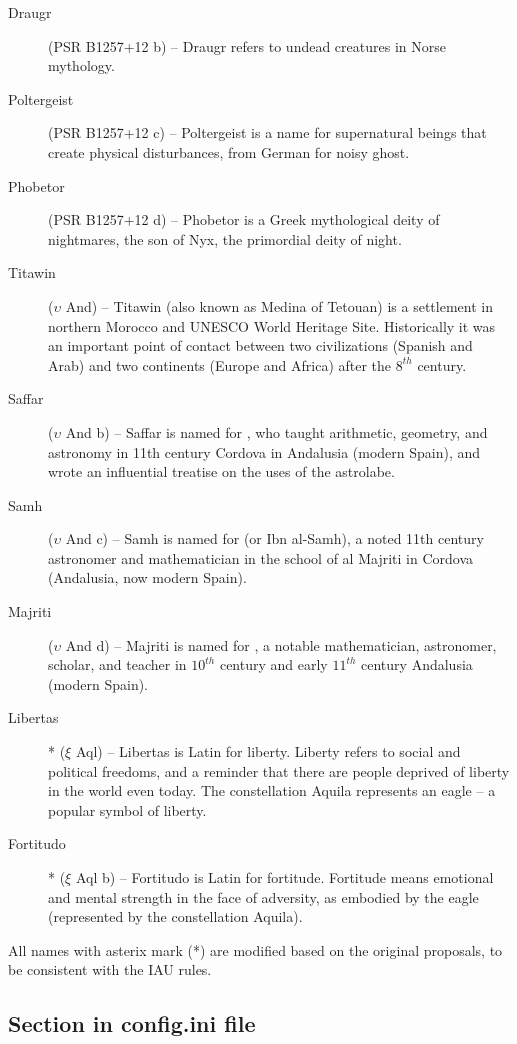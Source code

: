 \begin{description}
\item[Draugr] (PSR B1257+12 b) -- Draugr refers to undead creatures in Norse mythology.
\item[Poltergeist] (PSR B1257+12 c) -- Poltergeist is a name for supernatural beings that create physical disturbances, from German for noisy ghost.
\item[Phobetor] (PSR B1257+12 d) -- Phobetor is a Greek mythological deity of nightmares, the son of Nyx, the primordial deity of night.
\item[Titawin] ($\upsilon$ And) -- Titawin (also known as Medina of Tetouan) is a settlement in northern Morocco and UNESCO World Heritage Site. Historically it was an important point of contact between two civilizations (Spanish and Arab) and two continents (Europe and Africa) after the $8^{th}$ century.
\item[Saffar] ($\upsilon$ And b) -- Saffar is named for , who taught arithmetic, geometry, and astronomy in 11th century Cordova in Andalusia (modern Spain), and wrote an influential treatise on the uses of the astrolabe.
\item[Samh] ($\upsilon$ And c) -- Samh is named for  (or Ibn al-Samh), a noted 11th century astronomer and mathematician in the school of al Majriti in Cordova (Andalusia, now modern Spain).
\item[Majriti] ($\upsilon$ And d) -- Majriti is named for , a notable mathematician, astronomer, scholar, and teacher in $10^{th}$ century and early $11^{th}$ century Andalusia (modern Spain).
\item[Libertas]* ($\xi$ Aql) -- Libertas is Latin for liberty. Liberty refers to social and political freedoms, and a reminder that there are people deprived of liberty in the world even today. The constellation Aquila represents an eagle -- a popular symbol of liberty.
\item[Fortitudo]* ($\xi$ Aql b) -- Fortitudo is Latin for fortitude. Fortitude means emotional and mental strength in the face of adversity, as embodied by the eagle (represented by the constellation Aquila).
\end{description}

All names with asterix mark (*) are modified based on the original proposals, to be consistent with the IAU rules.


\subsection{Section  in config.ini file}
\label{sec:plugins:Exoplanets:config}


